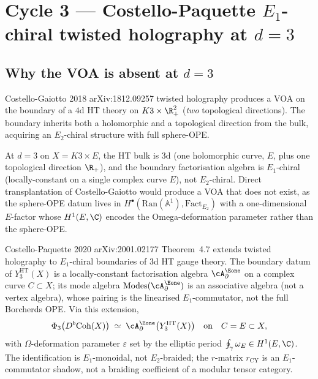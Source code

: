 \section{Cycle 3 --- Costello-Paquette $E_1$-chiral twisted holography
at $d = 3$}
\label{sec:agent12-costello-paquette-E1}

\subsection*{Why the VOA is absent at $d = 3$}

Costello-Gaiotto 2018 arXiv:1812.09257 twisted holography produces a
VOA on the boundary of a $4$d HT theory on $K3 \times \R_+^2$ (\emph{two}
topological directions). The boundary inherits both a holomorphic and
a topological direction from the bulk, acquiring an $E_2$-chiral
structure with full sphere-OPE.

At $d = 3$ on $X = K3 \times E$, the HT bulk is $3$d (one holomorphic
curve, $E$, plus one topological direction $\R_+$), and the boundary
factorisation algebra is $E_1$-chiral (locally-constant on a single
complex curve $E$), not $E_2$-chiral. Direct transplantation of
Costello-Gaiotto would produce a VOA that does not exist, as the
sphere-OPE datum lives in $H^\bullet(\mathrm{Ran}(\mathbb{A}^1),
\mathrm{Fact}_{E_2})$ with a one-dimensional $E$-factor whose
$H^1(E, \C)$ encodes the Omega-deformation parameter rather than the
sphere-OPE.

\begin{proposition}[Costello-Paquette bulk-boundary at $d = 3$]
\label{prop:agent12-A3-costello-paquette-d3}
Costello-Paquette 2020 arXiv:2001.02177 Theorem~4.7 extends twisted
holography to $E_1$-chiral boundaries of $3$d HT gauge theory. The
boundary datum of $Y^{\mathrm{HT}}_3(X)$ is a locally-constant
factorisation algebra $\cA^{\Eone}_\partial$ on a complex curve
$C \subset X$; its mode algebra $\mathrm{Modes}(\cA^{\Eone}_\partial)$
is an associative algebra (not a vertex algebra), whose pairing is the
linearised $E_1$-commutator, not the full Borcherds OPE. Via this
extension,
\[
 \Phi_3\bigl(D^b\mathrm{Coh}(X)\bigr)
 \;\simeq\;
 \cA^{\Eone}_\partial\bigl(Y^{\mathrm{HT}}_3(X)\bigr)
 \quad\text{on}\quad
 C = E \subset X,
\]
with $\Omega$-deformation parameter $\varepsilon$ set by the elliptic
period $\oint_\gamma \omega_E \in H^1(E, \C)$. The identification is
$E_1$-monoidal, not $E_2$-braided; the $r$-matrix $r_{\mathrm{CY}}$ is
an $E_1$-commutator shadow, not a braiding coefficient of a modular
tensor category.
\end{proposition}

